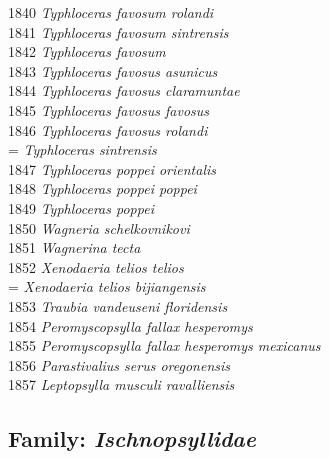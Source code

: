\documentclass[
]{article}
\begin{document}
1840 \emph{Typhloceras favosum rolandi}\\
1841 \emph{Typhloceras favosum sintrensis}\\
1842 \emph{Typhloceras favosum}\\
1843 \emph{Typhloceras favosus asunicus}\\
1844 \emph{Typhloceras favosus claramuntae}\\
1845 \emph{Typhloceras favosus favosus}\\
1846 \emph{Typhloceras favosus rolandi}\\
= \emph{Typhloceras sintrensis}\\
1847 \emph{Typhloceras poppei orientalis}\\
1848 \emph{Typhloceras poppei poppei}\\
1849 \emph{Typhloceras poppei}\\
1850 \emph{Wagneria schelkovnikovi}\\
1851 \emph{Wagnerina tecta}\\
1852 \emph{Xenodaeria telios telios}\\
= \emph{Xenodaeria telios bijiangensis}\\
1853 \emph{Traubia vandeuseni floridensis}\\
1854 \emph{Peromyscopsylla fallax hesperomys}\\
1855 \emph{Peromyscopsylla fallax hesperomys mexicanus}\\
1856 \emph{Parastivalius serus oregonensis}\\
1857 \emph{Leptopsylla musculi ravalliensis}

\hypertarget{family-ischnopsyllidae}{%
\subsection{\texorpdfstring{Family:
\emph{Ischnopsyllidae}}{Family: Ischnopsyllidae}}\label{family-ischnopsyllidae}}
\end{document}
